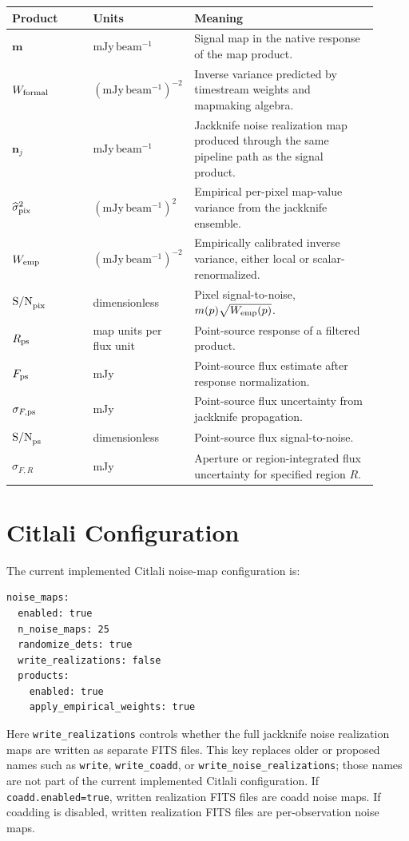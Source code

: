 \documentclass[11pt]{article}
\newcommand{\map}{\boldsymbol{m}}
\newcommand{\noise}{\boldsymbol{n}}
\newcommand{\snr}{\mathrm{S/N}}
\begin{document}
\begin{longtable}{p{0.22\linewidth} p{0.19\linewidth} p{0.50\linewidth}}
\toprule
Product & Units & Meaning \\
\midrule
\endhead
\(\map\) & \(\mathrm{mJy\,beam^{-1}}\) & Signal map in the native response of the map product. \\
\(W_{\rm formal}\) & \((\mathrm{mJy\,beam^{-1}})^{-2}\) & Inverse variance predicted by timestream weights and mapmaking algebra. \\
\(\noise_j\) & \(\mathrm{mJy\,beam^{-1}}\) & Jackknife noise realization map produced through the same pipeline path as the signal product. \\
\(\widehat{\sigma}^2_{\rm pix}\) & \((\mathrm{mJy\,beam^{-1}})^2\) & Empirical per-pixel map-value variance from the jackknife ensemble. \\
\(W_{\rm emp}\) & \((\mathrm{mJy\,beam^{-1}})^{-2}\) & Empirically calibrated inverse variance, either local or scalar-renormalized. \\
\(\snr_{\rm pix}\) & dimensionless & Pixel signal-to-noise, \(m(p)\sqrt{W_{\rm emp}(p)}\). \\
\(R_{\rm ps}\) & map units per flux unit & Point-source response of a filtered product. \\
\(F_{\rm ps}\) & mJy & Point-source flux estimate after response normalization. \\
\(\sigma_{F,\rm ps}\) & mJy & Point-source flux uncertainty from jackknife propagation. \\
\(\snr_{\rm ps}\) & dimensionless & Point-source flux signal-to-noise. \\
\(\sigma_{F,R}\) & mJy & Aperture or region-integrated flux uncertainty for specified region \(R\). \\
\bottomrule
\end{longtable}

\section{Citlali Configuration}

The current implemented Citlali noise-map configuration is:

\begin{lstlisting}
noise_maps:
  enabled: true
  n_noise_maps: 25
  randomize_dets: true
  write_realizations: false
  products:
    enabled: true
    apply_empirical_weights: true
\end{lstlisting}

Here \texttt{write\_realizations} controls whether the full jackknife noise
realization maps are written as separate FITS files. This key replaces older
or proposed names such as \texttt{write}, \texttt{write\_coadd}, or
\texttt{write\_noise\_realizations}; those names are not part of the current
implemented Citlali configuration. If \texttt{coadd.enabled=true}, written
realization FITS files are coadd noise maps. If coadding is disabled, written
realization FITS files are per-observation noise maps.
\end{document}
